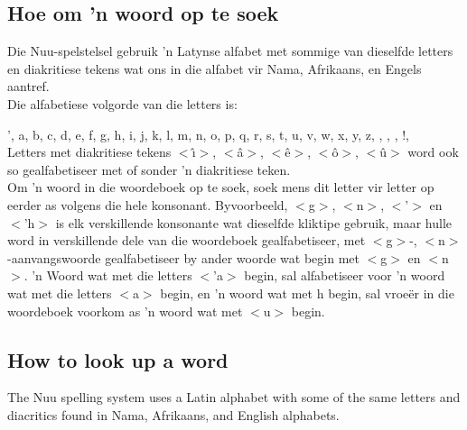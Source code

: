 \markboth{}{}
\subsection{Hoe om 'n woord op te soek}
\label{s:lookup_a}
\markboth{}{}

Die N\textipa{\textvertline}uu-spelstelsel gebruik 'n Latynse alfabet
met sommige van dieselfde letters en diakritiese tekens wat ons in die
alfabet vir Nama, Afrikaans, en Engels aantref.\\

Die alfabetiese volgorde van die letters is:

', a, b, c, d, e, f, g, h, i, j, k, l, m, n, o, p, q, r, s, t, u, v,
w, x, y, z, , \textipa{\textvertline},
\textipa{\textdoublevertline}, !, \textipa{\textdoublebarpipe}\\

Letters met diakritiese tekens $<$\^{\i}$>$, $<$\^{a}$>$, $<$\^{e}$>$,
$<$\^{o}$>$, $<$\^{u}$>$ word ook so gealfabetiseer met of sonder 'n
diakritiese teken.\\

Om 'n woord in die woordeboek op te soek, soek mens dit letter vir
letter op eerder as volgens die hele konsonant. Byvoorbeeld,
$<$g\textipa{\textdoublebarpipe}$>$,
$<$n\textipa{\textdoublebarpipe}$>$,
$<$\textipa{\textdoublebarpipe}'$>$ en
$<$\textipa{\textdoublebarpipe}'h$>$ is elk verskillende konsonante
wat dieselfde kliktipe gebruik, maar hulle word in verskillende dele
van die woordeboek gealfabetiseer, met
$<$g\textipa{\textdoublebarpipe}$>$-,
$<$n\textipa{\textdoublebarpipe}$>$-aanvangswoorde gealfabetiseer by
ander woorde wat begin met $<$g$>$ en $<$n$>$. 'n Woord wat met die
letters $<$\textipa{\textdoublebarpipe}'a$>$ begin, sal alfabetiseer
voor 'n woord wat met die letters $<$\textipa{\textdoublebarpipe}a$>$
begin, en 'n woord wat met \textipa{\textdoublebarpipe}h begin, sal
vroe\"{e}r in die woordeboek voorkom as 'n woord wat met
$<$\textipa{\textdoublebarpipe}u$>$ begin.


\markboth{}{}
\addtocounter{subsection}{-1}
\tocless\subsection{How to look up a word}
{}
\label{s:lookup_e}
\markboth{}{}

The N\textipa{\textvertline}uu spelling system uses a Latin alphabet
with some of the same letters and diacritics found in Nama, Afrikaans,
and English alphabets.\\

